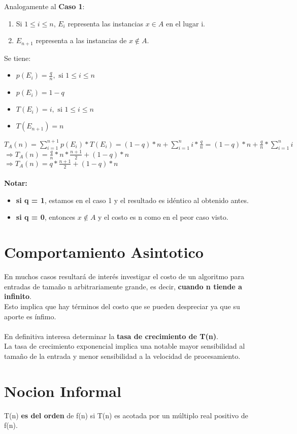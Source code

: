 \documentclass[a4paper,10pt]{article}
\begin{document}
Analogamente al \textbf{Caso 1}:
\begin{enumerate}
  \item Si $1 \leq i \leq n$, $E_i$ representa las instancias $x \in A$ en el lugar i.
  \item $E_{n+1}$ representa a las instancias de $x\notin A$.
\end{enumerate}
Se tiene:
\begin{itemize}
  \item $p(E_i) = \frac{q}{n}, \text{ si } 1\leq i \leq n$
  \item $p(E_i) = 1-q$
  \item $T(E_i) = i , \text{ si } 1\leq i \leq n$
  \item $T(E_{n+1}) = n$
\end{itemize}
$T_A(n) = \displaystyle\sum_{i=1}^{n+1} p(E_i) * T(E_i) = (1-q) * n + \sum_{i=1}^n i * \frac{q}{n} = (1-q) * n + \frac{q}{n} * \sum_{i=1}^n i$\\
$\Rightarrow T_A(n) = \displaystyle\frac{q}{n} * n * \frac{n+1}{2} + (1-q) * n$\\
$\Rightarrow T_A(n) = \displaystyle q * \frac{n+1}{2} + (1-q) * n$\\\\
\textbf{Notar:}
\begin{itemize}
  \item \textbf{si q = 1}, estamos en el caso 1 y el resultado es idéntico al obtenido antes.
  \item \textbf{si q = 0}, entonces $x \notin A$ y el costo es n como en el peor caso visto.
\end{itemize}
\section{Comportamiento Asintotico}
En muchos casos resultará de interés investigar el costo de un algoritmo para entradas de tamaño
n arbitrariamente grande, es decir, \textbf{cuando n tiende a infinito}.\\
Esto implica que hay términos del costo que se pueden despreciar ya que su aporte es ínfimo.\\\\
En definitiva interesa determinar la \textbf{tasa de crecimiento de T(n)}.\\
La tasa de crecimiento exponencial implica una notable mayor sensibilidad al tamaño de la
entrada y menor sensibilidad a la velocidad de procesamiento.

\section{Nocion Informal}
T(n) \textbf{es del orden} de f(n) si T(n) es acotada por un múltiplo real positivo de f(n).
\end{document}
